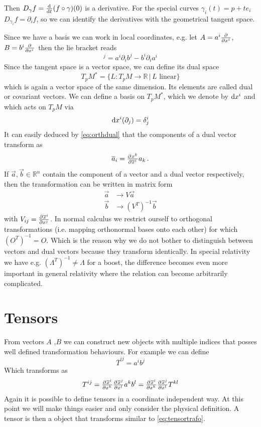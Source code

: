 Then $D_\gamma f=\od{}{t}(f\circ\gamma)(0)$ is a derivative.
For the special curves $\gamma_i(t)=p+te_i$
$D_{\gamma_i} f=\partial_if$, so we can identify the derivatives with the geometrical tangent space.\par
Since we have a basis we can work in local coordinates, e.g. let $A=a^i\pd{}{{x^i}}$, $B=b^i\pd{}{{x^i}}$ then the lie bracket reads
\begin{equation}
    [A,B]^j=a^i\partial_ib^j-b^i\partial_ia^i
\end{equation}
Since the tangent space is a vector space, we can define its dual space
\begin{equation}
    T_pM^*=\{L:T_pM\to \mathbb{R}\, |\, L \text{ linear}\}
\end{equation}
which is again a vector space of the same dimension. Its elements are called dual or covariant vectors.
We can define a basis on $	T_pM^*$, which we denote by $\dif x^i$ and  which acts on $T_pM$ via
\begin{equation}
    \dif x^i(\partial_j)=\delta^i_j\label{eq:orthdual}
\end{equation}
It can easily deduced by \eqref{eq:orthdual} that the components of a dual vector transform as
\begin{equation}
    \overline{a}_i=\pd{x^k}{{\overline{x}^i}}a_k\, .
\end{equation}
If $\vec{a},\vec{b}\in\mathbb{R}^n$ contain the component of a vector and a dual vector respectively, then the transformation can be written in matrix form
\begin{align*}
\vec{a}&\to V\vec{a}\\
\vec{b}&\to\left(V^T\right)^{-1}\vec{b}
\end{align*}
with $V_{ij}=\pd{\overline{x}^i}{{x^j}}$. In normal calculus we restrict ourself to orthogonal transformations (i.e. mapping orthonormal bases onto each other) for which $(O^T)^{-1}=O$. Which is the reason why we do not bother to distinguish between vectors and dual vectors because they transform identically. In special relativity we have e.g. $(\Lambda^T)^{-1}\neq\Lambda$ for a boost, the difference becomes even more important in general relativity where the relation can become arbitrarily complicated.
\section{Tensors}
From vectors $A$ ,$B$ we can construct new objects with multiple indices that posses well defined transformation behaviours. For example we can define
\begin{equation}
    \overline{T}^{ij}=a^ib^j
\end{equation}
Which transforms as
\begin{equation}
    T^{ij}=\pd{\overline{x}^i}{{x^k}}\pd{\overline{x}^j}{{x^l}}a^kb^l=\pd{\overline{x}^i}{{x^k}}\pd{\overline{x}^j}{{x^l}}T^{kl}\label{eq:tensortrafo}
\end{equation}
Again it is possible to define tensors in a coordinate independent way. At this point we will make things easier and only consider the physical definition. A tensor is then a object that transforms similar to \eqref{eq:tensortrafo}.
